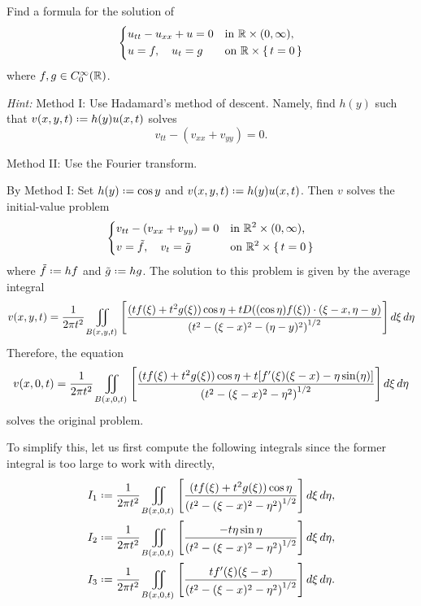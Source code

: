 \begin{problem}
  Find a formula for the solution of
  \[
    \left\{
      \begin{aligned}
        &u_{tt}-u_{xx}+u=0&&\text{in \(\mathbb{R}\times(0,\infty)\),}\\
        &u=f,\quad u_t=g&&\text{on \(\mathbb{R}\times\{\,t=0\,\}\)}
      \end{aligned}
    \right.
  \]
  where \(f,g\in C_0^\infty(\mathbb{R})\).

  \noindent\emph{Hint:} Method I: Use Hadamard's method of descent. Namely, find
  \(h(y)\) such that \(v(x,y,t)\defeq h(y)u(x,t)\) solves
  \[
    v_{tt}-(v_{xx}+v_{yy})=0.
  \]

  \noindent Method II: Use the Fourier transform.
\end{problem}
\begin{solution*}
  By Method I: Set \(h(y)\defeq\cos y\) and \(v(x,y,t)\defeq
  h(y)u(x,t)\). Then \(v\) solves the initial-value problem
  \[
    \left\{
      \begin{aligned}
        &v_{tt}-(v_{xx}+v_{yy})=0%
        &&\text{in \(\R^2\times(0,\infty)\),}\\
        &v=\tilde f,\quad v_t=\tilde g
        &&\text{on \(\R^2\times\{\,t=0\,\}\)}
      \end{aligned}
    \right.
  \]
  where \(\tilde f\defeq hf\) and \(\tilde g\defeq hg\). The solution to
  this problem is given by the average integral
  \[
    v(x,y,t)=%
    \frac{1}{2\pi t^2}\iint_{B(x,y,t)}%
    \left[%
      \frac{(tf(\xi)+t^2g(\xi))\cos\eta%
        +tD((\cos\eta)f(\xi))\cdot(\xi-x,\eta-y)}%
      {{(t^2-(\xi-x)^2-(\eta-y)^2)}^{1/2}}%
    \right]\diff\xi\diff\eta
  \]
  Therefore, the equation
  \[
    v(x,0,t)=%
    \frac{1}{2\pi t^2}\iint_{B(x,0,t)}%
    \left[%
      \frac{(tf(\xi)+t^2g(\xi))\cos\eta%
        +t[f'(\xi)(\xi-x)-\eta\sin(\eta)]}%
      {{(t^2-(\xi-x)^2-\eta^2)}^{1/2}}%
    \right]\diff\xi\diff\eta
  \]
  solves the original problem.

  To simplify this, let us first compute the following integrals since the
  former integral is too large to work with directly,
  \begin{align*}
    I_1
    &\defeq\frac{1}{2\pi t^2}\iint_{B(x,0,t)}
      \left[
      \frac{(tf(\xi)+t^2g(\xi))\cos \eta}{{(t^2-(\xi-x)^2-\eta^2)}^{1/2}}
      \right]\diff\xi\diff\eta,
    \\
    I_2
    &\defeq\frac{1}{2\pi t^2}\iint_{B(x,0,t)}
      \left[
      \frac{-t\eta\sin\eta}{{(t^2-(\xi-x)^2-\eta^2)}^{1/2}}
      \right]\diff\xi\diff\eta,
    \\
    I_3
    &\defeq\frac{1}{2\pi t^2}\iint_{B(x,0,t)}
      \left[
      \frac{tf'(\xi)(\xi-x)}{{(t^2-(\xi-x)^2-\eta^2)}^{1/2}}
      \right]\diff\xi\diff\eta.
  \end{align*}


\end{solution*}
